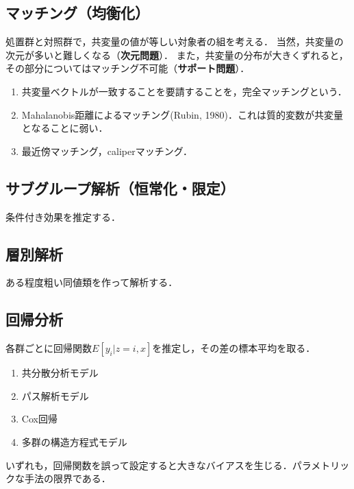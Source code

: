 \documentclass[uplatex,dvipdfmx]{jsreport}
\begin{document}
\subsection{マッチング（均衡化）}

処置群と対照群で，共変量の値が等しい対象者の組を考える．
当然，共変量の次元が多いと難しくなる（\textbf{次元問題}）．
また，共変量の分布が大きくずれると，その部分についてはマッチング不可能（\textbf{サポート問題}）．

\begin{example}\mbox{}
    \begin{enumerate}
        \item 共変量ベクトルが一致することを要請することを，完全マッチングという．
        \item Mahalanobis距離によるマッチング(Rubin, 1980)．これは質的変数が共変量となることに弱い．
        \item 最近傍マッチング，caliperマッチング．
    \end{enumerate}
\end{example}

\subsection{サブグループ解析（恒常化・限定）}

条件付き効果を推定する．

\subsection{層別解析}

ある程度粗い同値類を作って解析する．

\subsection{回帰分析}

各群ごとに回帰関数$E[y_i|z=i,x]$を推定し，その差の標本平均を取る．

\begin{example}\mbox{}
    \begin{enumerate}
        \item 共分散分析モデル
        \item パス解析モデル
        \item Cox回帰
        \item 多群の構造方程式モデル
    \end{enumerate}
    いずれも，回帰関数を誤って設定すると大きなバイアスを生じる．パラメトリックな手法の限界である．
\end{example}
\end{document}
